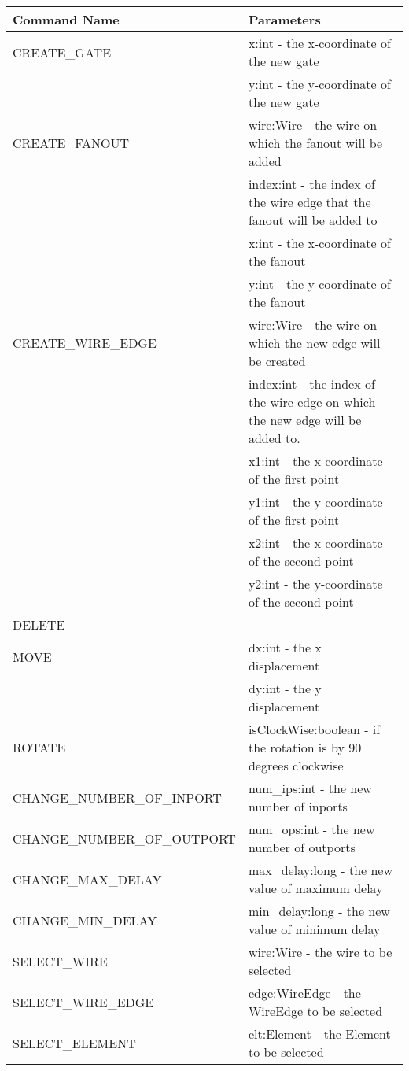 \begin{table}
 \begin{tabular}{p{6cm} | p{8cm}} 
  Command Name & Parameters \\
 \hline
  CREATE\_GATE & x:int - the x-coordinate of the new gate\\
	      & y:int - the y-coordinate of the new gate \\
 \hline
  CREATE_FANOUT & wire:Wire - the wire on which the fanout will be added \\
		& index:int - the index of the wire edge that the fanout will be added to \\
		& x:int - the x-coordinate of the fanout \\
		& y:int - the y-coordinate of the fanout \\
 \hline
  CREATE_WIRE_EDGE & wire:Wire - the wire on which the new edge will be created \\
		  & index:int - the index of the wire edge on which the new edge will be added to. \\
		  & x1:int - the x-coordinate of the first point \\
		  & y1:int - the y-coordinate of the first point \\
		  & x2:int - the x-coordinate of the second point \\
		  & y2:int - the y-coordinate of the second point \\
 \hline
  DELETE & \\
 \hline
  MOVE & dx:int - the x displacement \\
      & dy:int - the y displacement \\
 \hline
  ROTATE & isClockWise:boolean - if the rotation is by 90 degrees clockwise \\
 \hline
  CHANGE_NUMBER_OF_INPORT & num_ips:int - the new number of inports \\
 \hline
  CHANGE_NUMBER_OF_OUTPORT & num_ops:int - the new number of outports \\
 \hline
  CHANGE_MAX_DELAY & max_delay:long - the new value of maximum delay \\
 \hline
  CHANGE_MIN_DELAY & min_delay:long - the new value of minimum delay \\
 \hline
  SELECT_WIRE & wire:Wire - the wire to be selected \\
 \hline
  SELECT_WIRE_EDGE & edge:WireEdge - the WireEdge to be selected \\
 \hline
  SELECT_ELEMENT & elt:Element - the Element to be selected \\

\end{tabular}
\end{table}
